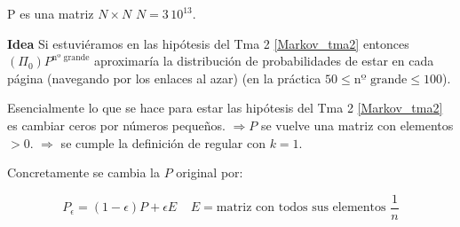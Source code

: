 P es una matriz $N \times N$ $N = 3 \, 10^{13}$.

\textbf{Idea} Si estuviéramos en las hipótesis del Tma 2 \ref{Markov_tma2} entonces  $(\Pi_0) P^{\text{nº grande}}$ aproximaría la distribución de probabilidades de estar en cada página (navegando por los enlaces al azar) (en la práctica $50 \leq \text{nº grande} \leq 100$).


Esencialmente lo que se hace para estar las hipótesis del Tma 2 \ref{Markov_tma2} es cambiar ceros por números pequeños. 
$\Rightarrow P$ se vuelve una matriz con elementos $> 0$.
$\Rightarrow$ se cumple la definición de regular con $k=1$.

Concretamente se cambia la $P$ original por:

$$P_{\epsilon} = (1-\epsilon) P + \epsilon E \;\;\;\; E = \text{matriz con todos sus elementos } \frac{1}{n}$$

